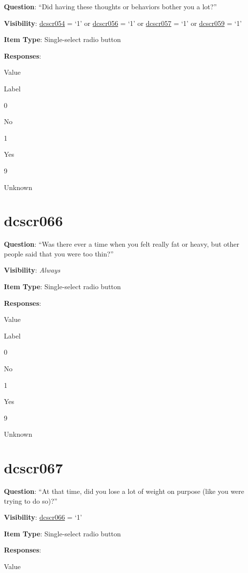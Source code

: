 \documentclass[]{book}
\begin{document}
\textbf{Question}: ``Did having these thoughts or behaviors bother you a lot?''

\textbf{Visibility}: \protect\hyperlink{dcscr054}{dcscr054} = `1' or \protect\hyperlink{dcscr056}{dcscr056} = `1' or \protect\hyperlink{dcscr057}{dcscr057} = `1' or \protect\hyperlink{dcscr059}{dcscr059} = `1'

\textbf{Item Type}: Single-select radio button

\textbf{Responses}:

Value

Label

0

No

1

Yes

9

Unknown

\hypertarget{dcscr066}{%
\section{dcscr066}\label{dcscr066}}

\textbf{Question}: ``Was there ever a time when you felt really fat or heavy, but other people said that you were too thin?''

\textbf{Visibility}: \emph{Always}

\textbf{Item Type}: Single-select radio button

\textbf{Responses}:

Value

Label

0

No

1

Yes

9

Unknown

\hypertarget{dcscr067}{%
\section{dcscr067}\label{dcscr067}}

\textbf{Question}: ``At that time, did you lose a lot of weight on purpose (like you were trying to do so)?''

\textbf{Visibility}: \protect\hyperlink{dcscr066}{dcscr066} = `1'

\textbf{Item Type}: Single-select radio button

\textbf{Responses}:

Value
\end{document}
